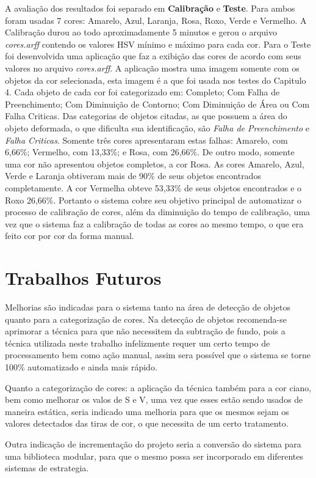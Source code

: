 A avaliação dos resultados foi separado em \textbf{Calibração} e \textbf{Teste}. Para ambos foram usadas 7 cores: Amarelo, Azul, Laranja, Rosa, Roxo, Verde e Vermelho. A Calibração durou ao todo aproximadamente 5 minutos e gerou o arquivo \textit{cores.arff} contendo os valores HSV mínimo e máximo para cada cor. Para o Teste foi desenvolvida uma aplicação que faz a exibição das cores de acordo com seus valores no arquivo \textit{cores.arff}. A aplicação mostra uma imagem somente com os objetos da cor selecionada, esta imagem é a que foi usada nos testes do Capitulo 4. Cada objeto de cada cor foi categorizado em: Completo; Com Falha de Preenchimento; Com Diminuição de Contorno; Com Diminuição de Área ou Com Falha Criticas. Das categorias de objetos citadas, as que possuem a área do objeto deformada, o que dificulta sua identificação, são \textit{Falha de Preenchimento} e \textit{Falha Criticas}. Somente tr\^{e}s cores apresentaram estas falhas: Amarelo, com 6,66\%; Vermelho, com 13,33\%; e Rosa, com 26,66\%. De outro modo, somente uma cor não apresentou objetos completos, a cor Rosa. As cores Amarelo, Azul, Verde e Laranja obtiveram mais de 90\% de seus objetos encontrados completamente. A cor Vermelha obteve 53,33\% de seus objetos encontrados e o Roxo 26,66\%. 
Portanto o sistema cobre seu objetivo principal de automatizar o processo de calibração de cores, além da diminuição do tempo de calibração, uma vez que o sistema faz a calibração de todas as cores ao mesmo tempo, o que era feito cor por cor da forma manual.	

\section{Trabalhos Futuros}
Melhorias são indicadas para o sistema tanto na área de detecção de objetos quanto para a categorização de cores. Na detecção de objetos recomenda-se aprimorar a técnica para que não necessitem da subtração de fundo, pois a técnica utilizada neste trabalho infelizmente requer um certo tempo de processamento bem como ação manual, assim sera possível que o sistema se torne 100\% automatizado e ainda mais rápido.

 Quanto a categorização de cores: a aplicação da técnica também para a cor ciano, bem como melhorar os valos de S e V, uma vez que esses estão sendo usados de maneira estática, seria indicado uma melhoria para que os mesmos sejam os valores detectados das tiras de cor, o que necessita de um certo tratamento.
 
Outra indicação de incrementação do projeto seria a conversão do sistema para uma biblioteca modular, para que o mesmo possa ser incorporado em diferentes sistemas de estrategia. 